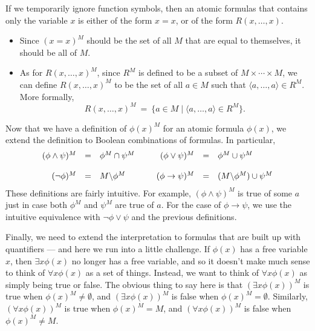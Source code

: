 If we temporarily ignore function symbols, then an atomic formulas
that contains only the variable $x$ is either of the form $x=x$, or of
the form $R(x,\dots ,x)$.
\begin{itemize}
  \item Since $(x=x)^M$ should be the set of all
    $M$ that are equal to themselves, it should be all of $M$.
  \item As for $R(x,\dots ,x)^M$, since $R^M$ is defined to be a subset of
$M\times\cdots \times M$, we can define $R(x,\dots ,x)^M$ to be the
set of all $a\in M$ such that $\langle a,\dots ,a\rangle\in R^M$.
More formally, 
\[ R(x,\dots ,x)^M \: = \: \{ a\in M \mid \langle a,\dots ,a\rangle
  \in R^M \} .\]
\end{itemize}
Now that we have a definition of $\phi (x)^M$ for an atomic formula
$\phi (x)$, we extend the definition to Boolean combinations of
formulas.  In particular,
\[ \begin{array}{r c l p{0.2cm} r c l}
     (\phi\wedge\psi )^M &=& \phi ^M\cap \psi ^M  & & (\phi\vee\psi
                                                      )^M & = & \phi
                                                                ^M\cup
                                                                \psi
                                                                ^M \\ \\
     (\neg\phi )^M &=&  M\backslash \phi ^M & & (\phi\to\psi )^M &=& 
                                             (M\backslash \phi ^M)\cup
                                             \psi ^M \end{array} \]
These definitions are fairly intuitive.  For example, $(\phi\wedge
\psi )^M$ is true of some $a$ just in case both $\phi ^M$ and $\psi^M$
are true of $a$.  For the case of $\phi\to\psi$, we use the intuitive
equivalence with $\neg\phi\vee\psi$ and the previous definitions.

Finally, we need to extend the interpretation to formulas that are
built up with quantifiers --- and here we run into a little challenge.
If $\phi (x)$ has a free variable $x$, then $\exists x\phi (x)$ no
longer has a free variable, and so it doesn't make much sense to think
of $\forall x\phi (x)$ as a set of things.  Instead, we want to think
of $\forall x\phi (x)$ as simply being true or false.  The obvious
thing to say here is that $(\exists x\phi (x))^M$ is true when
$\phi (x)^M\neq\emptyset$, and $(\exists x\phi (x))^M$ is false when
$\phi (x)^M=\emptyset$.  Similarly, $(\forall x\phi (x))^M$ is true
when $\phi (x)^M=M$, and $(\forall x\phi (x))^M$ is false when
$\phi (x)^M\neq M$.

